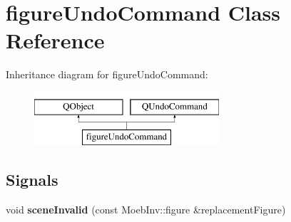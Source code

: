 \hypertarget{classfigure_undo_command}{}\section{figure\+Undo\+Command Class Reference}
\label{classfigure_undo_command}
Inheritance diagram for figure\+Undo\+Command\+:\begin{figure}[H]
\begin{center}
\leavevmode
\includegraphics[height=2.000000cm]{classfigure_undo_command}
\end{center}
\end{figure}
\subsection*{Signals}
\begin{DoxyCompactItemize}
\item 
\mbox{\label{classfigure_undo_command_a0826ae627f25daaa23ba9ccdd7e8fda2}} 
void {\bfseries scene\+Invalid} (const Moeb\+Inv\+::figure \&replacement\+Figure)
\end{DoxyCompactItemize}
